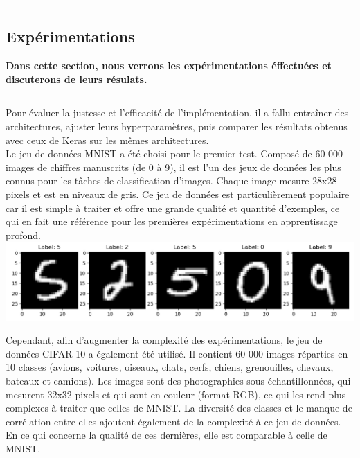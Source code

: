 {\color{gray}\hrule}
\begin{center}
\section{Expérimentations}
\textbf{Dans cette section, nous verrons les expérimentations éffectuées et discuterons de leurs résulats.}
\bigskip
\end{center}
{\color{gray}\hrule}
\begin{multicols}{2}

Pour évaluer la justesse et l’efficacité de l’implémentation, il a fallu entraîner 
des architectures, ajuster leurs hyperparamètres, puis comparer les résultats obtenus avec 
ceux de Keras sur les mêmes architectures. \\

Le jeu de données MNIST a été choisi pour le premier test. Composé de 
60 000 images de chiffres manuscrits (de 0 à 9), il est l’un des jeux de données 
les plus connus pour les tâches de classification d’images. Chaque image mesure 
28x28 pixels et est en niveaux de gris. Ce jeu de données est particulièrement
populaire car il est simple à traiter et offre une grande qualité et quantité 
d’exemples, ce qui en fait une référence pour les premières expérimentations en 
apprentissage profond. \\

\includegraphics[width=\columnwidth]{images/mnist_samples.png}
\hfill\break

Cependant, afin d’augmenter la complexité des expérimentations, le jeu de données CIFAR-10\cite{CIFAR10} a également 
été utilisé. Il contient 60 000 images réparties en 10 classes (avions, voitures, oiseaux, chats, cerfs, 
chiens, grenouilles, chevaux, bateaux et camions). Les images sont des photographies sous échantillonnées, qui mesurent 32x32 pixels et qui sont en couleur 
(format RGB), ce qui les rend plus complexes à traiter que celles de MNIST. La diversité des classes et le manque de corrélation 
entre elles ajoutent également de la complexité à ce jeu de données. En ce qui concerne la qualité de ces dernières,
elle est comparable à celle de MNIST. \\


\end{multicols}

